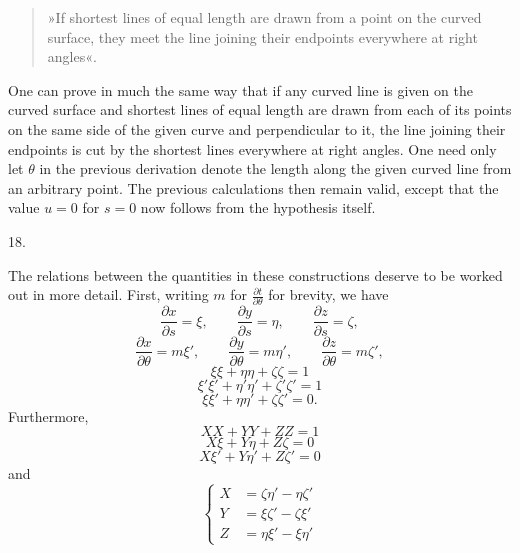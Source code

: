%
\begin{quote}
»If shortest lines of equal length are drawn from a point on the curved surface, they meet the line joining their endpoints everywhere at right angles«.
\end{quote}
\noindent\hspace*{1.2em}One can prove in much the same way that if any curved line is given on the curved surface and shortest lines of equal length are drawn from each of its points on the same side of the given curve and perpendicular to it, the line joining their endpoints is cut by the shortest lines everywhere at right angles. One need only let $\theta$ in the previous derivation denote the length along the given curved line from an arbitrary point. The previous calculations then remain valid, except that the value $u=0$ for $s=0$ now follows from the hypothesis itself.

\begin{center}18.\end{center}
\noindent\hspace*{1.2em}The relations between the quantities in these constructions deserve to be worked out in more detail. First, writing $m$ for $\frac{\partial t}{\partial\theta}$ for brevity, we have
\begin{equation}
\frac{\partial x}{\partial s}=\xi,\qquad\frac{\partial y}{\partial s}=\eta,\qquad\frac{\partial z}{\partial s}=\zeta,\tag{1}
\end{equation}
\begin{equation}
\frac{\partial x}{\partial\theta}=m\xi',\qquad\frac{\partial y}{\partial\theta}=m\eta',\qquad\frac{\partial z}{\partial\theta}=m\zeta',\tag{2}
\end{equation}
\begin{equation}\xi\xi+\eta\eta+\zeta\zeta=1\tag{3}\end{equation}
\begin{equation}\xi'\xi'+\eta'\eta'+\zeta'\zeta'=1\tag{4}\end{equation}
\begin{equation}\xi\xi'+\eta\eta'+\zeta\zeta'=0.\tag{5}\end{equation}
Furthermore,
\begin{equation}XX+YY+ZZ=1\tag{6}\end{equation}
\begin{equation}X\xi+Y\eta+Z\zeta=0\tag{7}\end{equation}
\begin{equation}X\xi'+Y\eta'+Z\zeta'=0\tag{8}\end{equation}
and
\begin{equation}
\left\{\begin{aligned}X&=\zeta\eta'-\eta\zeta'\\Y&=\xi\zeta'-\zeta\xi'\\Z&=\eta\xi'-\xi\eta'\end{aligned}\right.\tag*{[9]}
\end{equation}
